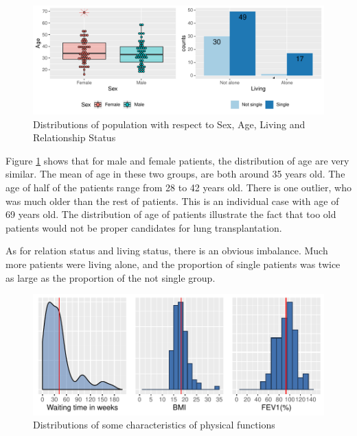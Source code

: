 \documentclass[11pt, a4paper]{article}\usepackage[]{graphicx}\usepackage[]{color}
\makeatletter
\def\maxwidth{ %
  \ifdim\Gin@nat@width>\linewidth
    \linewidth
  \else
    \Gin@nat@width
  \fi
}
\newenvironment{knitrout}{}{} %
\makeatother
\begin{document}
\begin{figure}[ht]
\centering
\begin{knitrout}
\color{fgcolor}
\includegraphics[width=\maxwidth]{plots/pagesex-1} 

\end{knitrout}
\caption{Distributions of population with respect to Sex, Age, Living and Relationship Status}\label{fig:fig1}
\end{figure}

Figure \ref{fig:fig1} shows that for male and female patients, the distribution of age are very similar. The mean of age in these two groups, are both around 35 years old. The age of half of the patients range from 28 to 42 years old. There is one outlier, who was much older than the rest of patients. This is an individual case with age of 69 years old. The distribution of age of patients illustrate the fact that too old patients would not be proper candidates for lung transplantation.


As for relation status and living status, there is an obvious imbalance. Much more patients were living alone, and the proportion of single patients was twice as large as the proportion of the not single group.


\begin{figure}[ht]
\begin{knitrout}
\color{fgcolor}
\includegraphics[width=\maxwidth]{plots/pcontin-1} 

\end{knitrout}
\caption{Distributions of some characteristics of physical functions}\label{fig:fig2}
\end{figure}
\end{document}
